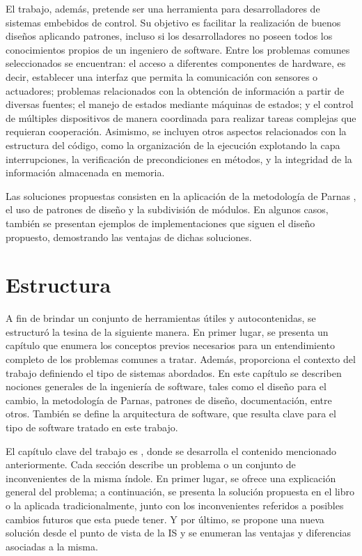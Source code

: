 El trabajo, además, pretende ser una herramienta para desarrolladores de sistemas embebidos de control. Su objetivo es facilitar la realización de buenos diseños aplicando patrones, incluso si los desarrolladores no poseen todos los conocimientos propios de un ingeniero de software. Entre los problemas comunes seleccionados se encuentran: el acceso a diferentes componentes de hardware, es decir, establecer una interfaz que permita la comunicación con sensores o actuadores; problemas relacionados con la obtención de información a partir de diversas fuentes; el manejo de estados mediante máquinas de estados; y el control de múltiples dispositivos de manera coordinada para realizar tareas complejas que requieran cooperación. Asimismo, se incluyen otros aspectos relacionados con la estructura del código, como la organización de la ejecución explotando la capa interrupciones, la verificación de precondiciones en métodos, y la integridad de la información almacenada en memoria.

Las soluciones propuestas consisten en la aplicación de la metodología de Parnas \cite{parnas72}, el uso de patrones de diseño y la subdivisión de módulos. En algunos casos, también se presentan ejemplos de implementaciones que siguen el diseño propuesto, demostrando las ventajas de dichas soluciones.

\section*{Estructura}

A fin de brindar un conjunto de herramientas útiles y autocontenidas, se estructuró la tesina de la siguiente manera. En primer lugar, se presenta un capítulo que enumera los conceptos previos necesarios para un entendimiento completo de los problemas comunes a tratar. Además, proporciona el contexto del trabajo definiendo el tipo de sistemas abordados. En este capítulo se describen nociones generales de la ingeniería de software, tales como el diseño para el cambio, la metodología de Parnas, patrones de diseño, documentación, entre otros. También se define la arquitectura de software, que resulta clave para el tipo de software tratado en este trabajo.

El capítulo clave del trabajo es , donde se desarrolla el contenido mencionado anteriormente. Cada sección describe un problema o un conjunto de inconvenientes de la misma índole. En primer lugar, se ofrece una explicación general del problema; a continuación, se presenta la solución propuesta en el libro o la aplicada tradicionalmente, junto con los inconvenientes referidos a posibles cambios futuros que esta puede tener. Y por último, se propone una nueva solución desde el punto de vista de la IS y se enumeran las ventajas y diferencias asociadas a la misma.



